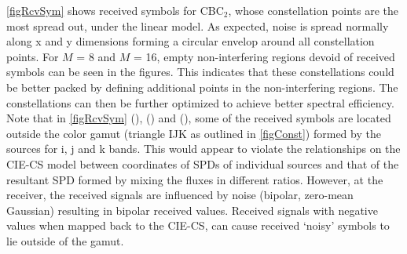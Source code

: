 
\figurename{ }\ref{figRcvSym} shows received symbols for CBC$_{2}$, whose constellation points are the most spread out, under the linear model. As expected, noise is spread normally along x and y dimensions forming a circular envelop around all constellation points. For $M$ = 8 and $M$ = 16, empty non-interfering regions devoid of received symbols can be seen in the figures. This indicates that these constellations could be better packed by defining additional points in the non-interfering regions. The constellations can then be further optimized to achieve better spectral efficiency. Note that in \figurename{ }\ref{figRcvSym} (),
() and (), some of the received
symbols are located outside the color gamut (triangle IJK
as outlined in \figurename{ }\ref{figConst}) formed by the sources for
i, j and k bands. This would appear to violate the relationships on the CIE-CS model between coordinates of SPDs of individual sources and that of the resultant SPD formed by mixing the fluxes in different ratios. However, at the receiver, the
received signals are influenced by noise (bipolar, zero-mean Gaussian)
resulting in bipolar received values. Received signals with negative values when mapped back to the CIE-CS, can cause received `noisy' symbols to lie outside of the gamut.

